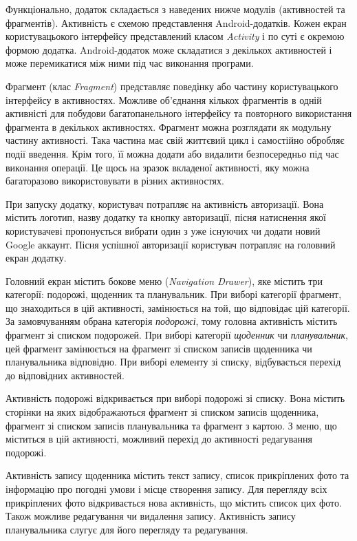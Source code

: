 \documentclass[../main.tex]{subfiles}
\begin{document}
Функціонально, додаток складається з наведених нижче модулів (активностей та фрагментів). Активність є схемою представлення Android-додатків. Кожен екран користувацьокого інтерфейсу представлений класом \textit{Activity} і по суті є окремою формою додатка. Android-додаток може складатися з декількох активностей і може перемикатися між ними під час виконання програми. 

Фрагмент (клас \textit{Fragment}) представляє поведінку або частину користувацького інтерфейсу в активностях. Можливе об'єднання кількох фрагментів в одній активністі для побудови багатопанельного інтерфейсу та повторного використання фрагмента в декількох активностях. Фрагмент можна розглядати як модульну частину активності. Така частина має свій життєвий цикл і самостійно обробляє події введення. Крім того, її можна додати або видалити безпосередньо під час виконання операції. Це щось на зразок вкладеної активності, яку можна багаторазово використовувати в різних активностях.

При запуску додатку, користувач потрапляє на активність авторизації. Вона містить логотип, назву додатку та кнопку авторизації, пісня натиснення якої  користувачеві пропонується вибрати один з уже існуючих чи додати новий Google аккаунт. Пісня успішної авторизації користувач потрапляє на головний екран додатку.

Головний екран містить бокове меню (\textit{Navigation Drawer}), яке містить три категорії: подорожі, щоденник та планувальник. При виборі категорії фрагмент, що знаходиться в цій активності, замінюється на той, що відповідає цій категорії. За замовчуванням обрана категорія \textit{подорожі}, тому головна активність містить фрагмент зі списком подорожей. При виборі категорії \textit{щоденник} чи \textit{планувальник}, цей фрагмент замінюється на фрагмент зі списком записів щоденника чи планувальника відповідно. При виборі елементу зі списку, відбувається перехід до відповідних активностей.

Активність подорожі відкривається при виборі подорожі зі списку. Вона містить сторінки на яких відображаються фрагмент зі списком записів щоденника, фрагмент зі списком записів планувальника та фрагмент з картою. З меню, що міститься в цій активності, можливий перехід до активності редагування подорожі.

Активність запису щоденника містить текст запису, список прикріплених фото та інформацію про погодні умови і місце створення запису. Для перегляду всіх прикріплених фото відкривається нова активність, що містить список цих фото. Також можливе редагування чи видалення запису. Активність запису планувальника слугує для його перегляду та редагування.
\end{document}
